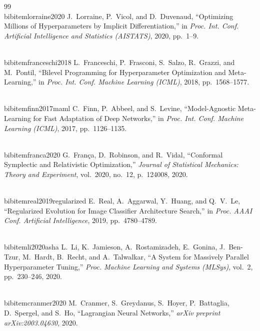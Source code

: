 \documentclass[12pt,a4paper]{article}
\begin{document}
\begin{thebibliography}{99}
\\bibitem{lorraine2020}
J.~Lorraine, P.~Vicol, and D.~Duvenaud,
``Optimizing Millions of Hyperparameters by Implicit Differentiation,''
in \textit{Proc. Int. Conf. Artificial Intelligence and Statistics (AISTATS)},
2020, pp.~1--9.

\\bibitem{franceschi2018}
L.~Franceschi, P.~Frasconi, S.~Salzo, R.~Grazzi, and M.~Pontil,
``Bilevel Programming for Hyperparameter Optimization and Meta-Learning,''
in \textit{Proc. Int. Conf. Machine Learning (ICML)},
2018, pp.~1568--1577.

\\bibitem{finn2017maml}
C.~Finn, P.~Abbeel, and S.~Levine,
``Model-Agnostic Meta-Learning for Fast Adaptation of Deep Networks,''
in \textit{Proc. Int. Conf. Machine Learning (ICML)},
2017, pp.~1126--1135.

\\bibitem{franca2020}
G.~Fran\c{c}a, D.~Robinson, and R.~Vidal,
``Conformal Symplectic and Relativistic Optimization,''
\textit{Journal of Statistical Mechanics: Theory and Experiment},
vol.~2020, no.~12, p.~124008, 2020.

\\bibitem{real2019regularized}
E.~Real, A.~Aggarwal, Y.~Huang, and Q.~V.~Le,
``Regularized Evolution for Image Classifier Architecture Search,''
in \textit{Proc. AAAI Conf. Artificial Intelligence},
2019, pp.~4780--4789.

\\bibitem{li2020asha}
L.~Li, K.~Jamieson, A.~Rostamizadeh, E.~Gonina, J.~Ben-Tzur,
M.~Hardt, B.~Recht, and A.~Talwalkar,
``A System for Massively Parallel Hyperparameter Tuning,''
\textit{Proc. Machine Learning and Systems (MLSys)},
vol.~2, pp.~230--246, 2020.

\\bibitem{cranmer2020}
M.~Cranmer, S.~Greydanus, S.~Hoyer, P.~Battaglia, D.~Spergel, and S.~Ho,
``Lagrangian Neural Networks,''
\textit{arXiv preprint arXiv:2003.04630}, 2020.

\end{thebibliography}
\end{document}
